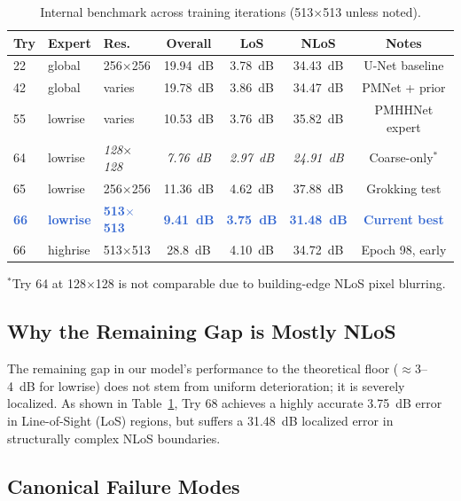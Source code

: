 \documentclass[11pt,a4paper]{article}
\newcommand{\ours}[1]{\textcolor{highlight}{\textbf{#1}}}
\begin{document}
\begin{table}[h!]
\centering
\caption{Internal benchmark across training iterations (513$\times$513 unless noted).}
\label{tab:progress}
\begin{center}
    

\begin{tabular}{lllcccc}
\toprule
\textbf{Try} & \textbf{Expert} & \textbf{Res.} & \textbf{Overall} & \textbf{LoS} & \textbf{NLoS} & \textbf{Notes} \\
\midrule
22 & global & 256$\times$256 & 19.94~dB & 3.78~dB & 34.43~dB & U-Net baseline \\
42 & global & varies & 19.78~dB & 3.86~dB & 34.47~dB & PMNet + prior \\
55 & lowrise & varies & 10.53~dB & 3.76~dB & 35.82~dB & PMHHNet expert \\
64 & lowrise & \textit{128$\times$128} & \textit{7.76~dB} & \textit{2.97~dB} & \textit{24.91~dB} & Coarse-only$^*$ \\
65 & lowrise & 256$\times$256 & 11.36~dB & 4.62~dB & 37.88~dB & Grokking test \\
\midrule
\ours{66} & \ours{lowrise} & \ours{513$\times$513} & \ours{9.41~dB} & \ours{3.75~dB} & \ours{31.48~dB} & \ours{Current best} \\
66 & highrise & 513$\times$513 & 28.8~dB & 4.10~dB & 34.72~dB & Epoch 98, early \\
\bottomrule
\end{tabular}
\end{center}
\end{table}
\footnotesize $^*$Try 64 at 128$\times$128 is not comparable due to building-edge NLoS pixel blurring.
\normalsize
\subsection{Why the Remaining Gap is Mostly NLoS}

The remaining gap in our model's performance to the theoretical floor ($\approx$3--4~dB for lowrise) does not stem from uniform deterioration; it is severely localized. As shown in Table~\ref{tab:progress}, Try 68 achieves a highly accurate 3.75~dB error in Line-of-Sight (LoS) regions, but suffers a 31.48~dB localized error in structurally complex NLoS boundaries. 

\subsection{Canonical Failure Modes}
\end{document}

